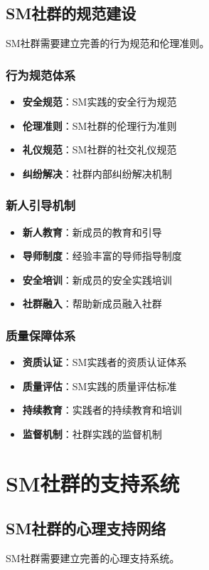\documentclass[12pt,UTF8]{ctexbook}
\begin{document}
\section{SM社群的规范建设}
SM社群需要建立完善的行为规范和伦理准则。

\subsection{行为规范体系}
\begin{itemize}[leftmargin=2cm]
	\item \textbf{安全规范}：SM实践的安全行为规范
	\item \textbf{伦理准则}：SM社群的伦理行为准则
	\item \textbf{礼仪规范}：SM社群的社交礼仪规范
	\item \textbf{纠纷解决}：社群内部纠纷解决机制
\end{itemize}

\subsection{新人引导机制}
\begin{itemize}[leftmargin=2cm]
	\item \textbf{新人教育}：新成员的教育和引导
	\item \textbf{导师制度}：经验丰富的导师指导制度
	\item \textbf{安全培训}：新成员的安全实践培训
	\item \textbf{社群融入}：帮助新成员融入社群
\end{itemize}

\subsection{质量保障体系}
\begin{itemize}[leftmargin=2cm]
	\item \textbf{资质认证}：SM实践者的资质认证体系
	\item \textbf{质量评估}：SM实践的质量评估标准
	\item \textbf{持续教育}：实践者的持续教育和培训
	\item \textbf{监督机制}：社群实践的监督机制
\end{itemize}

\chapter{SM社群的支持系统}
\section{SM社群的心理支持网络}
SM社群需要建立完善的心理支持系统。
\end{document}
